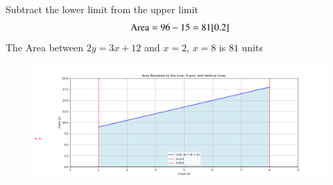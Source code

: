 \documentclass[journal]{IEEEtran}
\begin{document}
Subtract the lower limit from the upper limit\\
\begin{align}
      \text{Area} = 96 - 15 = 81
      \ref{0.2}
\end{align}
The Area between $2y=3x+12$ and $x=2$, $x=8$ is $81$ units 
\begin{figure}[h!]
   \centering
   \includegraphics[width=\linewidth]{figs/Figure_1.png}
   \caption{}
   \label{stemplot}
\end{figure}
\end{document}
